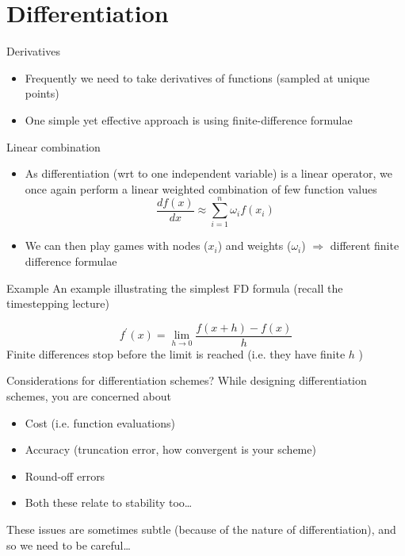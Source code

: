 \documentclass[presentation]{beamer}
\begin{document}
\section{Differentiation}
\label{sec:org15ffa98}
\begin{frame}[label={sec:orge1f50c6}]{Derivatives}
\begin{itemize}
\item Frequently we need to take derivatives of functions (sampled at
unique points)
\item One simple yet effective approach is using \alert{finite-difference} formulae
\end{itemize}
\begin{block}{Linear combination}
\begin{itemize}
\item As differentiation (wrt to one independent variable) is a linear operator,
we once again perform a linear weighted combination of few function values
\[ \frac{d f(x)}{d x} \approx \sum_{i=1}^{n} \omega_i f(x_i) \]
\item We can then play games with \alert{nodes} (\(x_i\)) and \alert{weights} (\(\omega_i\))
\(\Rightarrow\) different finite difference formulae
\end{itemize}
\end{block}
\end{frame}
\begin{frame}[label={sec:org2d8883a}]{Example}
An example illustrating the simplest FD formula (recall the timestepping lecture)
\begin{example}
\[ f^{\prime}(x) = \lim_{h \to 0} \frac{f(x+h) - f(x) }{h}\]
Finite differences stop before the limit is reached (i.e. they have finite
\(h\) )
\end{example}
\end{frame}
\begin{frame}[label={sec:orga6ec999}]{Considerations for differentiation schemes?}
While designing differentiation schemes, you are concerned about
\begin{itemize}
\item Cost (i.e. function evaluations)
\item Accuracy (truncation error, how convergent is your scheme)
\item Round-off errors
\item Both these relate to stability too\ldots{}
\end{itemize}

These issues are sometimes subtle (because of the nature of differentiation),
and so we need to be careful\ldots{}
\end{frame}
\end{document}

